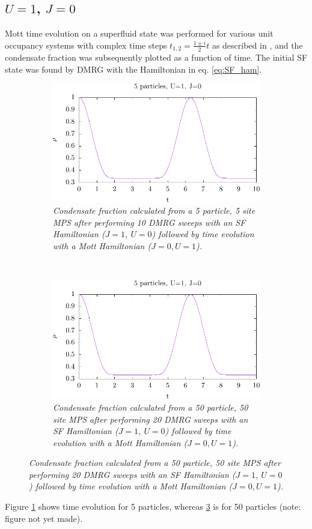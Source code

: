 \subsection{$U=1$, $J=0$}
Mott time evolution on a superfluid state was performed for various unit occupancy systems with complex time steps $t_{1,2}=\frac{1\pm i}{2}t$ as described in \cite{cmplx_t}, and the condensate fraction was subsequently plotted as a function of time. The initial SF state was found by DMRG with the Hamiltonian in eq. \ref{eq:SF_ham}.
\begin{figure}[h!]
    \centering
    \begin{subfigure}[t]{0.49\textwidth}
        \includegraphics[width=\textwidth]{Figures/TimeEvo5_U1_J0.pdf}
        \caption{\textit{Condensate fraction calculated from a 5 particle, 5 site MPS after performing 10 DMRG sweeps with an SF Hamiltonian ($J=1$, $U=0$) followed by time evolution with a Mott Hamiltonian ($J=0, U=1$).}}
        \label{fig:TimeEvo5_U1_J0}
    \end{subfigure}
    ~
    \begin{subfigure}[t]{0.49\textwidth}
        \includegraphics[width=\textwidth]{Figures/TimeEvo50_U1_J0.pdf}
        \caption{\textit{Condensate fraction calculated from a 50 particle, 50 site MPS after performing 20 DMRG sweeps with an SF Hamiltonian ($J=1$, $U=0$) followed by time evolution with a Mott Hamiltonian ($J=0, U=1$).}}
        \label{fig:TimeEvo50_U1_J0}
    \end{subfigure}    
\end{figure}
Figure \ref{fig:TimeEvo5_U1_J0} shows time evolution for 5 particles, whereas \ref{fig:TimeEvo50_U1_J0} is for 50 particles (note: figure not yet made). 


